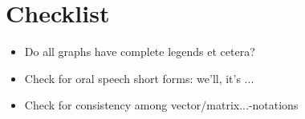 \chapter{Checklist}
\begin{itemize}
    \item Do all graphs have complete legends et cetera?
    \item Check for oral speech short forms: we'll, it's ...
    \item Check for consistency among vector/matrix...-notations
\end{itemize}